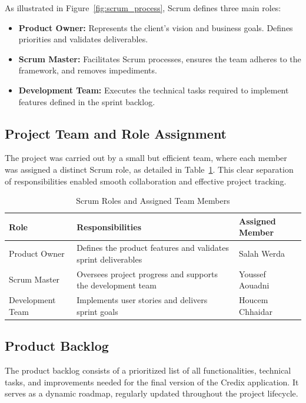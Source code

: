 As illustrated in Figure~\ref{fig:scrum_process}, Scrum defines three main roles:
\begin{itemize}
  \item \textbf{Product Owner:} Represents the client’s vision and business goals. Defines priorities and validates deliverables.
  \item \textbf{Scrum Master:} Facilitates Scrum processes, ensures the team adheres to the framework, and removes impediments.
  \item \textbf{Development Team:} Executes the technical tasks required to implement features defined in the sprint backlog.
\end{itemize}

\subsection{Project Team and Role Assignment}

The project was carried out by a small but efficient team, where each member was assigned a distinct Scrum role, as detailed in Table~\ref{tab:scrum_roles}. This clear separation of responsibilities enabled smooth collaboration and effective project tracking.

\begin{table}[H]
    \centering
    \begin{tabularx}{\textwidth}{|X|X|X|}
        \hline
        \textbf{Role} & \textbf{Responsibilities} & \textbf{Assigned Member} \\
        \hline
        Product Owner & Defines the product features and validates sprint deliverables & Salah Werda \\
        \hline
        Scrum Master & Oversees project progress and supports the development team & Youssef Aouadni \\
        \hline
        Development Team & Implements user stories and delivers sprint goals & Houcem Chhaidar \\
        \hline
    \end{tabularx}
    \caption{Scrum Roles and Assigned Team Members}
    \label{tab:scrum_roles}
\end{table}

\subsection{Product Backlog}

The product backlog consists of a prioritized list of all functionalities, technical tasks, and improvements needed for the final version of the Credix application. It serves as a dynamic roadmap, regularly updated throughout the project lifecycle.

